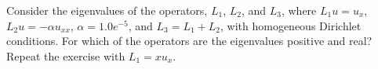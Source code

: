 \begin{exercise}{4.6}
    Consider the eigenvalues of the operators, $L_1$, $L_2$, and $L_3$, where $L_1 u = u_x$, $L_2 u = -\alpha u_{xx}$, $\alpha = 1.0 e^{-5}$, and $L_3 = L_1 + L_2$, with homogeneous Dirichlet conditions.
    For which of the operators are the eigenvalues positive and real?
    Repeat the exercise with $L_1 = x u_x$.
\end{exercise}

\begin{solution}{4.6}

\end{solution}